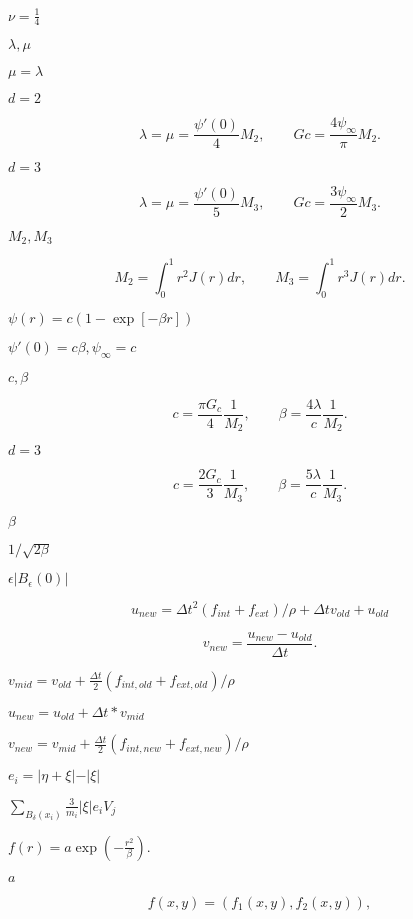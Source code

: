 \documentclass{article}
\begin{document}
$ \nu = \frac{1}{4} $
\pagebreak

$ \lambda, \mu $
\pagebreak

$ \mu = \lambda $
\pagebreak

$ d=2 $
\pagebreak

\[ \lambda = \mu = \frac{\psi'(0)}{4} M_2, \qquad Gc = \frac{4
\psi_{\infty}}{\pi} M_2. \]
\pagebreak

$ d=3$
\pagebreak

\[ \lambda = \mu = \frac{\psi'(0)}{5} M_3, \qquad Gc = \frac{3
\psi_{\infty}}{2} M_3. \]
\pagebreak

$M_2, M_3$
\pagebreak

\[ M_2 =\int_0^1 r^2 J(r) dr, \qquad M_3 = \int_0^1 r^3 J(r) dr. \]
\pagebreak

$ \psi(r) = c ( 1-\exp[-\beta r])$
\pagebreak

$
\psi'(0) = c\beta, \psi_{\infty} = c $
\pagebreak

$ c, \beta $
\pagebreak

\[ c = \frac{\pi G_c}{4} \frac{1}{M_2}, \qquad
    \beta = \frac{4 \lambda}{c} \frac{1}{M_2} .\]
\pagebreak

$ d=3 $
\pagebreak

\[ c = \frac{2 G_c}{3} \frac{1}{M_3}, \qquad
    \beta = \frac{5 \lambda}{c} \frac{1}{M_3} .\]
\pagebreak

$ \beta $
\pagebreak

$ 1/\sqrt{2\beta}$
\pagebreak

$ \epsilon |B_\epsilon(0)|$
\pagebreak

\[ u_{new} = \Delta t^2 (f_{int} + f_{ext}) / \rho  +
\Delta t v_{old} + u_{old} \]
\pagebreak

\[ v_{new} = \frac{u_{new} - u_{old}}{\Delta t}. \]
\pagebreak

$ v_{mid} = v_{old} + \frac{\Delta t}{2} (f_{int,old} + f_{ext,
old}) / \rho
$
\pagebreak

$ u_{new} = u_{old} + \Delta t * v_{mid} $
\pagebreak

$ v_{new} = v_{mid} +  \frac{\Delta t}{2} (f_{int,new} + f_{ext,
new}) / \rho $
\pagebreak

$ e_i = \vert \eta + \xi \vert - \vert \xi \vert $
\pagebreak

$ \sum\limits_{B_\delta(x_i)} \frac{3}{m_i} \vert \xi \vert e_i V_j $
\pagebreak

$ f(r) = a \exp(-\frac{r^2}{\beta}). $
\pagebreak

$ a$
\pagebreak

\[ f(x,y) = (f_1(x,y), f_2(x,y)), \]
\pagebreak
\end{document}
